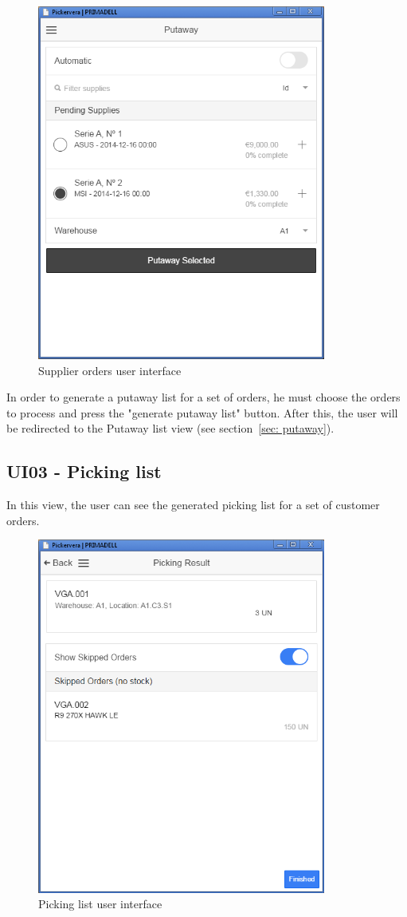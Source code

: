 \documentclass[a4paper]{article}
\begin{document}
\begin{figure}[h!]
\centerline{\includegraphics[width=9.5cm]{supplierOrders.png}}
\caption{Supplier orders user interface}
\end{figure}

In order to generate a putaway list for a set of orders, he must choose the orders to process and press the "generate putaway list" button. After this, the user will be redirected to the Putaway list view (see section~\ref{sec: putaway}). 
\newpage

\subsection{UI03 - Picking list}
\label{sec: picking}

In this view, the user can see the generated picking list for a set of customer orders. 

\begin{figure}[h!]
\centerline{\includegraphics[width=9.5cm]{pickingList.png}}
\caption{Picking list user interface}
\end{figure}
\end{document}
